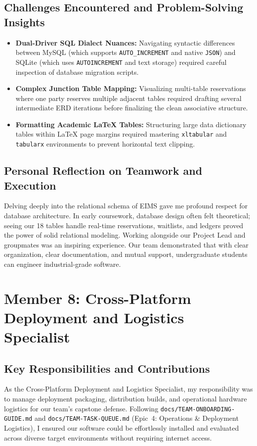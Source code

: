 \subsection{Challenges Encountered and Problem-Solving Insights}
\begin{itemize}
    \item \textbf{Dual-Driver SQL Dialect Nuances:} Navigating syntactic differences between MySQL (which supports \texttt{AUTO\_INCREMENT} and native \texttt{JSON}) and SQLite (which uses \texttt{AUTOINCREMENT} and text storage) required careful inspection of database migration scripts.
    \item \textbf{Complex Junction Table Mapping:} Visualizing multi-table reservations where one party reserves multiple adjacent tables required drafting several intermediate ERD iterations before finalizing the clean associative structure.
    \item \textbf{Formatting Academic LaTeX Tables:} Structuring large data dictionary tables within LaTeX page margins required mastering \texttt{xltabular} and \texttt{tabularx} environments to prevent horizontal text clipping.
\end{itemize}

\subsection{Personal Reflection on Teamwork and Execution}
Delving deeply into the relational schema of EIMS gave me profound respect for database architecture. In early coursework, database design often felt theoretical; seeing our 18 tables handle real-time reservations, waitlists, and ledgers proved the power of solid relational modeling. Working alongside our Project Lead and groupmates was an inspiring experience. Our team demonstrated that with clear organization, clear documentation, and mutual support, undergraduate students can engineer industrial-grade software.

\newpage
\section{Member 8: Cross-Platform Deployment and Logistics Specialist}
\label{sec:reflection_member_8}

\subsection{Key Responsibilities and Contributions}
As the Cross-Platform Deployment and Logistics Specialist, my responsibility was to manage deployment packaging, distribution builds, and operational hardware logistics for our team's capstone defense. Following \texttt{docs/TEAM-ONBOARDING-GUIDE.md} and \texttt{docs/TEAM-TASK-QUEUE.md} (Epic~4: Operations \& Deployment Logistics), I ensured our software could be effortlessly installed and evaluated across diverse target environments without requiring internet access.

